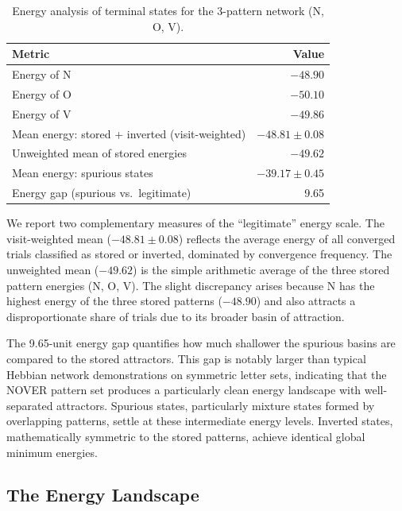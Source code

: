 \documentclass[11pt,a4paper,twocolumn]{article}
\begin{document}
\begin{table}[H]
    \centering
    \caption{Energy analysis of terminal states for the 3-pattern network
    (N, O, V).}
    \label{tab:spurious_energy}
    \small
    \begin{tabular}{@{}p{}r@{}}
        \toprule
        \textbf{Metric} & \textbf{Value} \\
        \midrule
        Energy of N & $-48.90$ \\
        Energy of O & $-50.10$ \\
        Energy of V & $-49.86$ \\
        \midrule
        Mean energy: stored + inverted (visit-weighted) & $-48.81 \pm 0.08$ \\
        Unweighted mean of stored energies & $-49.62$ \\
        Mean energy: spurious states & $-39.17 \pm 0.45$ \\
        \midrule
        Energy gap (spurious vs.\ legitimate) & 9.65 \\
        \bottomrule
    \end{tabular}
\end{table}

We report two complementary measures of the ``legitimate'' energy scale. The
visit-weighted mean ($-48.81 \pm 0.08$) reflects the average energy of all
converged trials classified as stored or inverted, dominated by convergence
frequency. The unweighted mean ($-49.62$) is the simple arithmetic average of
the three stored pattern energies (N, O, V). The slight discrepancy arises
because N has the highest energy of the three stored patterns ($-48.90$) and
also attracts a disproportionate share of trials due to its broader basin of
attraction.

The 9.65-unit energy gap quantifies how much shallower the spurious basins are
compared to the stored attractors. This gap is notably larger than typical
Hebbian network demonstrations on symmetric letter sets, indicating that the
NOVER pattern set produces a particularly clean energy landscape with
well-separated attractors. Spurious states, particularly mixture states formed
by overlapping patterns, settle at these intermediate energy levels. Inverted
states, mathematically symmetric to the stored patterns, achieve identical
global minimum energies.

\subsection{The Energy Landscape}
\label{sec:landscape}
\end{document}
